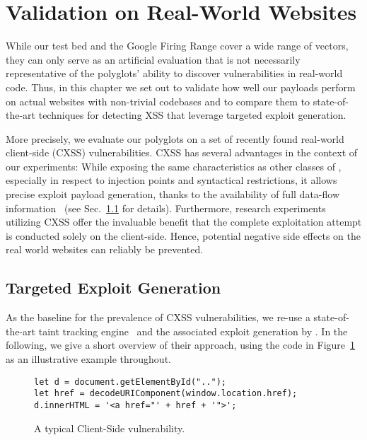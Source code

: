 \section{Validation on Real-World Websites}\label{sec:taint-validation}
While our test bed and the Google Firing Range cover a wide range of \xss{} vectors, they can only serve as an artificial evaluation that is not necessarily representative of the polyglots' ability to discover vulnerabilities in real-world code.
Thus, in this chapter we set out to validate how well our \xss{} payloads perform on actual websites with non-trivial codebases and to compare them to state-of-the-art techniques for detecting XSS that leverage targeted exploit generation.

More precisely, we evaluate our \xss{} polyglots on a set of recently found real-world client-side \xss{} (CXSS) vulnerabilities. 
CXSS has several advantages in the context of our experiments: 
While exposing the same characteristics as other classes of \xss{}, especially in respect to injection points and syntactical restrictions, it allows precise exploit payload generation, thanks to the availability of full data-flow information~\cite{LekStoJoh13,StoPfiKaiLek+15,MelDasShaBau+18} (see Sec.~\ref{sec:exploit-gen} for details). Furthermore, research experiments utilizing CXSS offer the invaluable benefit that the complete exploitation attempt is conducted solely on the client-side. Hence, potential negative side effects on the real world websites can reliably be prevented. 


\subsection{Targeted \xss{} Exploit Generation}\label{sec:exploit-gen}
As the baseline for the prevalence of CXSS vulnerabilities, we re-use a state-of-the-art taint tracking engine~\cite{foxhound} and the associated exploit generation by \citet{BenKleBarJoh21}.
In the following, we give a short overview of their approach, using the code in Figure~\ref{lst:xss-example} as an illustrative example throughout.



\begin{figure}[htb]
\begin{verbatim}
let d = document.getElementById("..");
let href = decodeURIComponent(window.location.href);
d.innerHTML = '<a href="' + href + '">';
\end{verbatim}

\caption{A typical Client-Side \xss{} vulnerability.}\label{lst:xss-example}
\end{figure}

